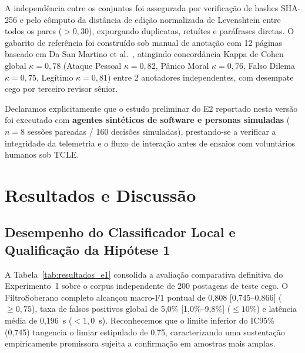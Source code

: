 \documentclass[runningheads]{llncs}
\begin{document}
A independência entre os conjuntos foi assegurada por verificação de hashes SHA-256 e pelo cômputo da distância de edição normalizada de Levenshtein entre todos os pares ($>0{,}30$), expurgando duplicatas, retuítes e paráfrases diretas. O gabarito de referência foi construído sob manual de anotação com 12 páginas baseado em Da San Martino et al.~\cite{dasanmartino2019fine}, atingindo concordância Kappa de Cohen global $\kappa = 0{,}78$ (Ataque Pessoal $\kappa=0{,}82$, Pânico Moral $\kappa=0{,}76$, Falso Dilema $\kappa=0{,}75$, Legítimo $\kappa=0{,}81$) entre 2 anotadores independentes, com desempate cego por terceiro revisor sênior.

Declaramos explicitamente que o estudo preliminar do E2 reportado nesta versão foi executado com \textbf{agentes sintéticos de software e personas simuladas} ($n=8$ sessões pareadas / 160 decisões simuladas), prestando-se a verificar a integridade da telemetria e o fluxo de interação antes de ensaios com voluntários humanos sob TCLE.

\section{Resultados e Discussão}

\subsection{Desempenho do Classificador Local e Qualificação da Hipótese 1}

A Tabela~\ref{tab:resultados_e1} consolida a avaliação comparativa definitiva do Experimento~1 sobre o corpus independente de 200 postagens de teste cego. O FiltroSoberano completo alcançou macro-F1 pontual de 0,808 [0,745--0,866] ($\ge 0{,}75$), taxa de falsos positivos global de 5,0\% [1,0\%--9,8\%] ($\le 10\%$) e latência média de 0,196~s ($<1{,}0$~s). Reconhecemos que o limite inferior do IC95\% (0,745) tangencia o limiar estipulado de 0,75, caracterizando uma sustentação empiricamente promissora sujeita a confirmação em amostras mais amplas.
\end{document}
